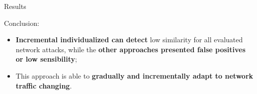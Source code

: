 \documentclass[newPxFont, numfooter, sectionpages]{beamer}
\begin{document}
\begin{frame}{Results}
	
	Conclusion:
	\begin{itemize}
		\item \textbf{Incremental individualized can detect} low similarity for all evaluated network attacks, while the \textbf{other approaches presented false positives or low sensibility};
		\item This approach is able to \textbf{gradually and incrementally adapt to network traffic changing}.
	\end{itemize}

\end{frame}
\end{document}
